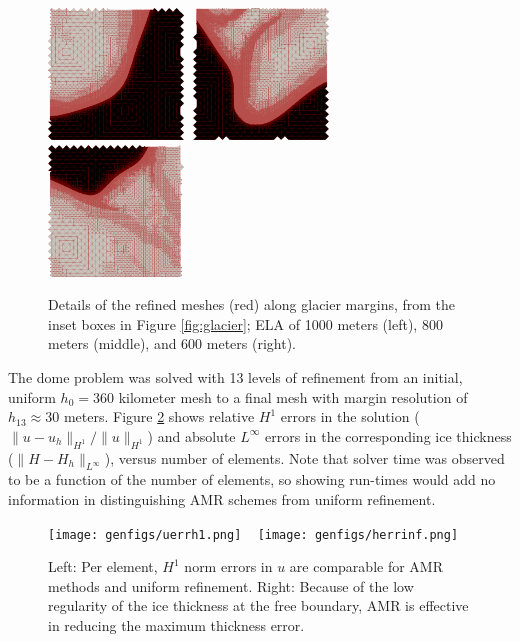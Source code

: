 \documentclass[]{interact}
\theoremstyle{plain}%
\theoremstyle{definition}
\theoremstyle{remark}
\begin{document}
\begin{figure}[ht]
\centering
\mbox{\includegraphics[width=0.32\textwidth]{static/glacier/sub1000.png} \,\includegraphics[width=0.32\textwidth]{static/glacier/sub800.png} \,\includegraphics[width=0.32\textwidth]{static/glacier/sub600.png}}
\caption{Details of the refined meshes (red) along glacier margins, from the inset boxes in Figure \ref{fig:glacier}; ELA of 1000 meters (left), 800 meters (middle), and 600 meters (right).}
\label{fig:insetmeshes}
\end{figure}

The dome problem was solved with 13 levels of refinement from an initial, uniform $h_0=360$ kilometer mesh to a final mesh with margin resolution of $h_{13}\approx 30$ meters.  Figure \ref{fig:domenormresults} shows relative $H^1$ errors in the solution ($\|u-u_h\|_{H^1}/\|u\|_{H^1}$) and absolute $L^\infty$ errors in the corresponding ice thickness ($\|H-H_h\|_{L^\infty}$), versus number of elements.  Note that solver time was observed to be a function of the number of elements, so showing run-times would add no information in distinguishing AMR schemes from uniform refinement.

\begin{figure}[ht]
\noindent\mbox{\texttt{[image: genfigs/uerrh1.png]} \, \texttt{[image: genfigs/herrinf.png]}}
\caption{Left: Per element, $H^1$ norm errors in $u$ are comparable for AMR methods and uniform refinement.  Right: Because of the low regularity of the ice thickness at the free boundary, AMR is effective in reducing the maximum thickness error.}
\label{fig:domenormresults}
\end{figure}
\end{document}
